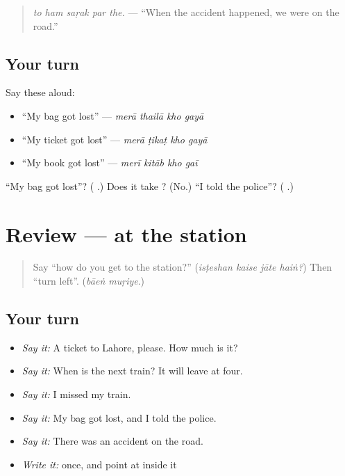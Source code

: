 \begin{quote}
\textbf{    }
\end{quote}

\begin{quote}
\emph{to ham saṛak par the.} — \textquotedblleft{}When the accident happened, we were on the road.\textquotedblright{}
\end{quote}

\subsection*{Your turn}
Say these aloud:

\begin{itemize}
\raggedright
  \item \textquotedblleft{}My bag got lost\textquotedblright{} — \emph{merā thailā kho gayā}
  \item \textquotedblleft{}My ticket got lost\textquotedblright{} — \emph{merā ṭikaṭ kho gayā}
  \item \textquotedblleft{}My book got lost\textquotedblright{} — \emph{merī kitāb kho gaī}
\end{itemize}

\begin{tcolorbox}[breakable,colback=teal!4,colframe=teal!35!black,title={Before you move on}]
\textquotedblleft{}My bag got lost\textquotedblright{}? (\textbf{   }.) Does it take \textbf{}? (No.) \textquotedblleft{}I told the police\textquotedblright{}? (\textbf{    }.)
\end{tcolorbox}
\section[(review)]{Review — at the station}

\label{lesson:UR-R271-at-the-station}



\begin{quote}
Say \textquotedblleft{}how do you get to the station?\textquotedblright{} (\emph{isṭeshan kaise jāte haiṅ?}) Then \textquotedblleft{}turn left\textquotedblright{}. (\emph{bāeṅ muṛiye}.)
\end{quote}

\subsection*{Your turn}
\begin{itemize}
\raggedright
  \item \emph{Say it:} A ticket to Lahore, please. How much is it?
  \item \emph{Say it:} When is the next train? It will leave at four.
  \item \emph{Say it:} I missed my train.
  \item \emph{Say it:} My bag got lost, and I told the police.
  \item \emph{Say it:} There was an accident on the road.
  \item \emph{Write it:} \textbf{} once, and point at  inside it
\end{itemize}

